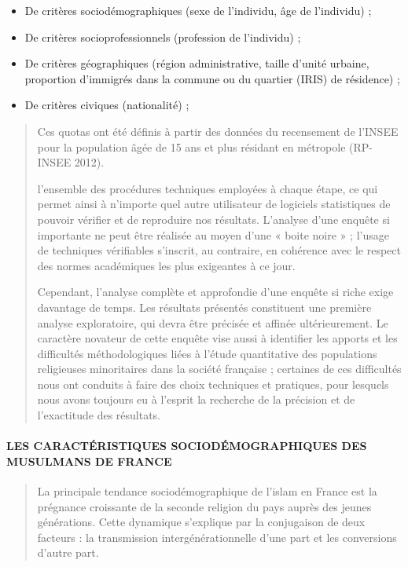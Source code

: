 \begin{itemize}
\item
  De critères sociodémographiques (sexe de l'individu, âge de
  l'individu) ;
\item
  De critères socioprofessionnels (profession de l'individu) ;
\item
  De critères géographiques (région administrative, taille d'unité
  urbaine, proportion d'immigrés dans la commune ou du quartier (IRIS)
  de résidence) ;
\item
  De critères civiques (nationalité) ;
\end{itemize}

\begin{quote}
Ces quotas ont été définis à partir des données du recensement de
l'INSEE pour la population âgée de 15 ans et plus résidant en métropole
(RP-INSEE 2012).



l'ensemble des procédures techniques employées à chaque étape, ce qui
permet ainsi à n'importe quel autre utilisateur de logiciels
statistiques de pouvoir vérifier et de reproduire nos résultats.
L'analyse d'une enquête si importante ne peut être réalisée au moyen
d'une « boite noire » ; l'usage de techniques vérifiables s'inscrit, au
contraire, en cohérence avec le respect des normes académiques les plus
exigeantes à ce jour.

Cependant, l'analyse complète et approfondie d'une enquête si riche
exige davantage de temps. Les résultats présentés constituent une
première analyse exploratoire, qui devra être précisée et affinée
ultérieurement. Le caractère novateur de cette enquête vise aussi à
identifier les apports et les difficultés méthodologiques liées à
l'étude quantitative des populations religieuses minoritaires dans la
société française ; certaines de ces difficultés nous ont conduits à
faire des choix techniques et pratiques, pour lesquels nous avons
toujours eu à l'esprit la recherche de la précision et de l'exactitude
des résultats.
\end{quote}

\hypertarget{les-caractuxe9ristiques-socioduxe9mographiques-des-musulmans-de-france}{%
\paragraph{LES CARACTÉRISTIQUES SOCIODÉMOGRAPHIQUES DES MUSULMANS DE
FRANCE}\label{les-caractuxe9ristiques-socioduxe9mographiques-des-musulmans-de-france}}

\begin{quote}
La principale tendance sociodémographique de l'islam en France est la
prégnance croissante de la seconde religion du pays auprès des jeunes
générations. Cette dynamique s'explique par la conjugaison de deux
facteurs : la transmission intergénérationnelle d'une part et les
conversions d'autre part.
\end{quote}

